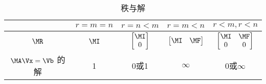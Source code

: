 \begin{table}[!ht]
    \centering
    \caption{秩与解}
    \label{table:rank}
    {\renewcommand{\arraystretch}{2}
    \begin{tabular}{|c|c|c|c|c|}
        \hline
         & $r = m = n$ & $r = n < m$ & $r = m < n$ & $r<m, r < n$ \\ \hline
        $\MR$ & $\MI$ & $\begin{bmatrix} \MI \\ 0 \\ \end{bmatrix}$ & $\begin{bmatrix} \MI & \MF \\ \end{bmatrix}$ & $\begin{bmatrix} \MI & \MF \\ 0 & 0 \\ \end{bmatrix}$ \\
         $\MA\Vx = \Vb$ 的解 & 1 & 0或1 & $\infty$ & 0或$\infty$ \\
        \hline
    \end{tabular}}
\end{table}


